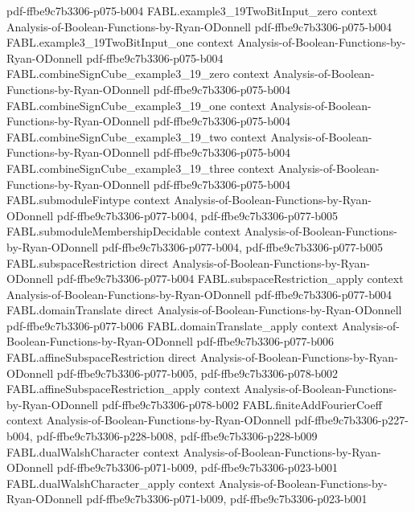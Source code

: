 \begin{theorem}
  {pdf-ffbe9c7b3306-p075-b004}
\proofstep
  {FABL.example3_19TwoBitInput_zero}
  {context}
  {Analysis-of-Boolean-Functions-by-Ryan-ODonnell}
  {pdf-ffbe9c7b3306-p075-b004}
\proofstep
  {FABL.example3_19TwoBitInput_one}
  {context}
  {Analysis-of-Boolean-Functions-by-Ryan-ODonnell}
  {pdf-ffbe9c7b3306-p075-b004}
\proofstep
  {FABL.combineSignCube_example3_19_zero}
  {context}
  {Analysis-of-Boolean-Functions-by-Ryan-ODonnell}
  {pdf-ffbe9c7b3306-p075-b004}
\proofstep
  {FABL.combineSignCube_example3_19_one}
  {context}
  {Analysis-of-Boolean-Functions-by-Ryan-ODonnell}
  {pdf-ffbe9c7b3306-p075-b004}
\proofstep
  {FABL.combineSignCube_example3_19_two}
  {context}
  {Analysis-of-Boolean-Functions-by-Ryan-ODonnell}
  {pdf-ffbe9c7b3306-p075-b004}
\proofstep
  {FABL.combineSignCube_example3_19_three}
  {context}
  {Analysis-of-Boolean-Functions-by-Ryan-ODonnell}
  {pdf-ffbe9c7b3306-p075-b004}
\proofstep
  {FABL.submoduleFintype}
  {context}
  {Analysis-of-Boolean-Functions-by-Ryan-ODonnell}
  {pdf-ffbe9c7b3306-p077-b004,
    pdf-ffbe9c7b3306-p077-b005}
\proofstep
  {FABL.submoduleMembershipDecidable}
  {context}
  {Analysis-of-Boolean-Functions-by-Ryan-ODonnell}
  {pdf-ffbe9c7b3306-p077-b004,
    pdf-ffbe9c7b3306-p077-b005}
\proofstep
  {FABL.subspaceRestriction}
  {direct}
  {Analysis-of-Boolean-Functions-by-Ryan-ODonnell}
  {pdf-ffbe9c7b3306-p077-b004}
\proofstep
  {FABL.subspaceRestriction_apply}
  {context}
  {Analysis-of-Boolean-Functions-by-Ryan-ODonnell}
  {pdf-ffbe9c7b3306-p077-b004}
\proofstep
  {FABL.domainTranslate}
  {direct}
  {Analysis-of-Boolean-Functions-by-Ryan-ODonnell}
  {pdf-ffbe9c7b3306-p077-b006}
\proofstep
  {FABL.domainTranslate_apply}
  {context}
  {Analysis-of-Boolean-Functions-by-Ryan-ODonnell}
  {pdf-ffbe9c7b3306-p077-b006}
\proofstep
  {FABL.affineSubspaceRestriction}
  {direct}
  {Analysis-of-Boolean-Functions-by-Ryan-ODonnell}
  {pdf-ffbe9c7b3306-p077-b005,
    pdf-ffbe9c7b3306-p078-b002}
\proofstep
  {FABL.affineSubspaceRestriction_apply}
  {context}
  {Analysis-of-Boolean-Functions-by-Ryan-ODonnell}
  {pdf-ffbe9c7b3306-p078-b002}
\proofstep
  {FABL.finiteAddFourierCoeff}
  {context}
  {Analysis-of-Boolean-Functions-by-Ryan-ODonnell}
  {pdf-ffbe9c7b3306-p227-b004,
    pdf-ffbe9c7b3306-p228-b008,
    pdf-ffbe9c7b3306-p228-b009}
\proofstep
  {FABL.dualWalshCharacter}
  {context}
  {Analysis-of-Boolean-Functions-by-Ryan-ODonnell}
  {pdf-ffbe9c7b3306-p071-b009,
    pdf-ffbe9c7b3306-p023-b001}
\proofstep
  {FABL.dualWalshCharacter_apply}
  {context}
  {Analysis-of-Boolean-Functions-by-Ryan-ODonnell}
  {pdf-ffbe9c7b3306-p071-b009,
    pdf-ffbe9c7b3306-p023-b001}

\end{theorem}
